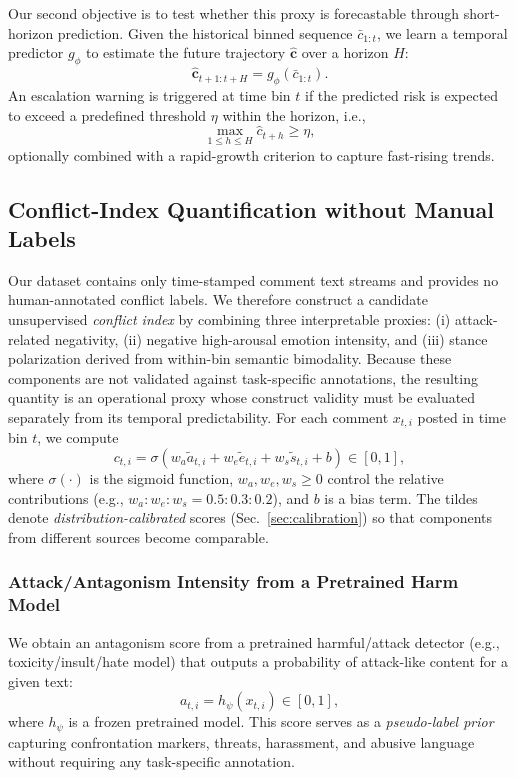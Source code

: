 \documentclass[journal]{IEEEtran}
\begin{document}
Our second objective is to test whether this proxy is forecastable through short-horizon prediction. Given the historical binned sequence $\bar{c}_{1:t}$, we learn a temporal predictor $g_\phi$ to estimate the future trajectory $\mathbf{\hat{c}}$ over a horizon $H$:
\begin{equation}
\mathbf{\hat{c}}_{t+1:t+H} = g_\phi(\bar{c}_{1:t}).
\end{equation}
An escalation warning is triggered at time bin $t$ if the predicted risk is expected to exceed a predefined threshold $\eta$ within the horizon, i.e.,
\begin{equation}
\max_{1 \le h \le H} \hat{c}_{t+h} \ge \eta,
\end{equation}
optionally combined with a rapid-growth criterion to capture fast-rising trends.

\subsection{Conflict-Index Quantification without Manual Labels}\label{sec:conflict_index}

Our dataset contains only time-stamped comment text streams and provides no human-annotated conflict labels. We therefore construct a candidate unsupervised \emph{conflict index} by combining three interpretable proxies: (i) attack-related negativity, (ii) negative high-arousal emotion intensity, and (iii) stance polarization derived from within-bin semantic bimodality. Because these components are not validated against task-specific annotations, the resulting quantity is an operational proxy whose construct validity must be evaluated separately from its temporal predictability. For each comment $x_{t,i}$ posted in time bin $t$, we compute
\begin{equation}
c_{t,i} = \sigma\!\left(w_a \tilde{a}_{t,i} + w_e \tilde{e}_{t,i} + w_s \tilde{s}_{t,i} + b\right)\in[0,1],
\label{eq:conflict_index_fusion}
\end{equation}
where $\sigma(\cdot)$ is the sigmoid function, $w_a,w_e,w_s \ge 0$ control the relative contributions (e.g., $w_a:w_e:w_s = 0.5:0.3:0.2$), and $b$ is a bias term. The tildes denote \emph{distribution-calibrated} scores (Sec.~\ref{sec:calibration}) so that components from different sources become comparable.

\subsubsection{Attack/Antagonism Intensity from a Pretrained Harm Model}
We obtain an antagonism score from a pretrained harmful/attack detector (e.g., toxicity/insult/hate model) that outputs a probability of attack-like content for a given text:
\begin{equation}
a_{t,i} = h_{\psi}(x_{t,i}) \in [0,1],
\label{eq:attack_score}
\end{equation}
where $h_{\psi}$ is a frozen pretrained model. This score serves as a \emph{pseudo-label prior} capturing confrontation markers, threats, harassment, and abusive language without requiring any task-specific annotation.
\end{document}

